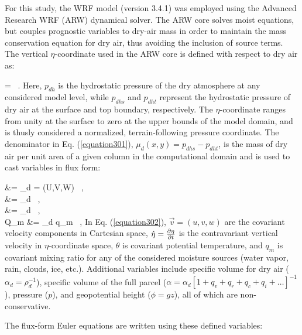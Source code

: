 For this study, the WRF model (version 3.4.1) was employed using the Advanced Research WRF (ARW) dynamical solver. The ARW core solves moist equations, but couples prognostic variables to dry-air mass in order to maintain the mass conservation equation for dry air, thus avoiding the inclusion of source terms. The vertical $\eta$-coordinate used in the ARW core is defined with respect to dry air as:


\be
\eta =  \mbox { .}
\label{equation301}
\ee
\noindent
 Here, $p_{dh}$ is the hydrostatic pressure of the dry atmosphere at any considered model level, while $p_{dhs}$ and $p_{dht}$ represent the hydrostatic pressure of dry air at the surface and top boundary, respectively. The $\eta$-coordinate ranges from unity at the surface to zero at the upper bounds of the model domain, and is thusly considered a normalized, terrain-following pressure coordinate. The denominator in Eq. (\autoref{equation301}), $\mu_d(x,y) = p_{dhs} - p_{dht}$, is the mass of dry air per unit area of a given column in the computational domain and is used to cast variables in flux form:

\bse \label{equation302}
\bal
{} &= \mu_d  = (U,V,W) \mbox{ ,} \label{equation302a} \\
\Omega &= \mu_d \dot{\eta} \mbox{ ,} \label{equation302b} \\
\Theta &= \mu_d \theta \mbox{ ,} \label{equation302c} \\
Q_m &= \mu_d q_m \mbox{ ,} \label{equation302d}
\eal
\ese
\noindent
 In Eq. (\autoref{equation302}), $\vec{v} = (u,v,w)$ are the covariant velocity components in Cartesian space, $\dot{\eta} = \frac{\partial\eta}{\partial t}$ is the contravariant vertical velocity in $\eta$-coordinate space, $\theta$ is covariant potential temperature, and $q_m$ is covariant mixing ratio for any of the considered moisture sources (water vapor, rain, clouds, ice, etc.). Additional variables include specific volume for dry air ($ \alpha_d = \rho_d^{-1}$), specific volume of the full parcel ($\alpha = \alpha_d[1 + q_v + q_r + q_c + q_i + \ldots]^{-1}$), pressure ($p$), and geopotential height ($\phi = gz$), all of which are non-conservative. 

The flux-form Euler equations are written using these defined variables:

